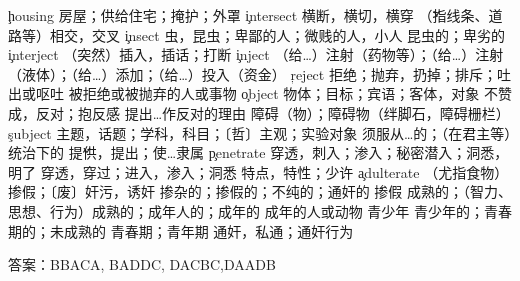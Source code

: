 \begin{multicols}{2}
\c{housing}  \n 房屋；供给住宅；掩护；外罩
\c{intersect}  \vt 横断，横切，横穿 \v （指线条、道路等）相交，交叉
\c{insect}  \n 虫，昆虫；卑鄙的人；微贱的人，小人 \a 昆虫的；卑劣的
\c{interject}  \vt （突然）插入，插话；打断
\c{inject}  \vt （给…）注射（药物等）；（给…）注射（液体）；（给…）添加；（给…）投入（资金）
\c{reject}  \vt 拒绝；抛弃，扔掉；排斥；吐出或呕吐 \n 被拒绝或被抛弃的人或事物
\c{object}  \n 物体；目标；宾语；客体，对象 \vi 不赞成，反对；抱反感 \vt 提出…作反对的理由
  \n 障碍（物）；障碍物（绊脚石，障碍栅栏）
\c{subject}  \n 主题，话题；学科，科目；〔哲〕主观；实验对象 \a 须服从…的；（在君主等）统治下的 \v 提供，提出；使…隶属 
\c{penetrate}  \vt 穿透，刺入；渗入；秘密潜入；洞悉，明了 \vi 穿透，穿过；进入，渗入；洞悉
  \n 特点，特性；少许
\c{adulterate}  \vt （尤指食物）掺假；〔废〕奸污，诱奸 \a 掺杂的；掺假的；不纯的；通奸的 \n 掺假
  \a 成熟的；（智力、思想、行为）成熟的；成年人的；成年的 \n 成年的人或动物
  \n 青少年 \a 青少年的；青春期的；未成熟的
  \n 青春期；青年期
  \n 通奸，私通；通奸行为
\end{multicols}
答案：BBACA, BADDC, DACBC,DAADB
